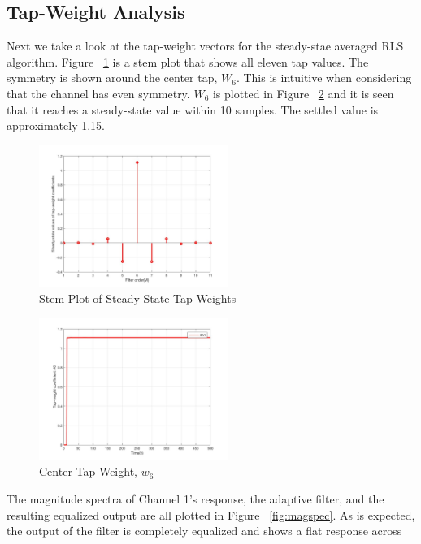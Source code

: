 \documentclass[journal]{IEEEtran}
\begin{document}
\subsection{Tap-Weight Analysis}
Next we take a look at the tap-weight vectors for the steady-stae averaged RLS algorithm. Figure ~\ref{fig:weights} is a stem plot that shows all
eleven tap values. The symmetry is shown around the center tap, $W_6$. This is intuitive when considering that the channel has even symmetry. $W_6$ is plotted in Figure
~\ref{fig:w6} and it is seen that it reaches a steady-state value
within 10 samples. The settled value is approximately 1.15.
\begin{figure}[H]
  \centering
  \captionsetup{justification=centering,font = small}
  \includegraphics[width=0.55\textwidth, inner] {Plots/Project2_weights.jpg}
  \caption{Stem Plot of Steady-State Tap-Weights}
    \label{fig:weights}
\end{figure}
\begin{figure}[H]
  \centering
  \captionsetup{justification=centering,font = small}
  \includegraphics[width=0.55\textwidth, inner] {Plots/Project2_w6.jpg}
  \caption{Center Tap Weight, $w_6$}
    \label{fig:w6}
\end{figure}
The magnitude spectra of Channel 1's response, the adaptive filter, and the resulting equalized output
are all plotted in Figure ~\ref{fig:magspec}. As is expected, the output of the filter is completely equalized and shows a flat response across
\end{document}
